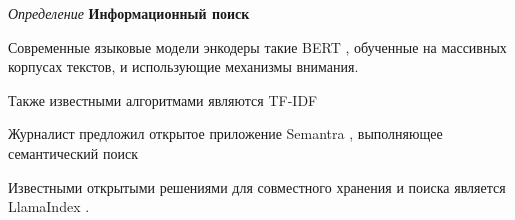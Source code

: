 
\textit{Определение} \textbf{Информационный поиск}

Современные языковые модели энкодеры такие BERT \cite{devlin2018bert}, обученные на массивных корпусах текстов,
 и использующие механизмы внимания.

Также известными алгоритмами являются TF-IDF \cite{sparck1972statistical,}

Журналист предложил открытое приложение Semantra \cite{Freedman2024}, выполняющее семантический поиск

Известными открытыми решениями для совместного хранения и поиска является LlamaIndex \cite{Liu_LlamaIndex_2022}.




